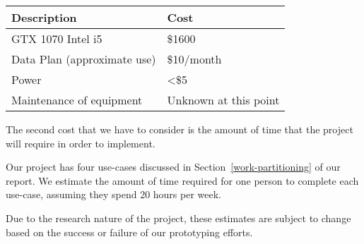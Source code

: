 \documentclass{scrreprt}
\begin{document}
\begin{longtable}[c]{@{}ll@{}}
\toprule
\begin{minipage}[t]{0.47\columnwidth}\raggedright\strut
{Description}
\strut\end{minipage} &
\begin{minipage}[t]{0.47\columnwidth}\raggedright\strut
{Cost}
\strut\end{minipage}\tabularnewline\midrule
\begin{minipage}[t]{0.47\columnwidth}\raggedright\strut
{GTX 1070 Intel i5}
\strut\end{minipage} &
\begin{minipage}[t]{0.47\columnwidth}\raggedright\strut
{\$1600}
\strut\end{minipage}\tabularnewline
\begin{minipage}[t]{0.47\columnwidth}\raggedright\strut
{Data Plan (approximate use)}
\strut\end{minipage} &
\begin{minipage}[t]{0.47\columnwidth}\raggedright\strut
{\$10/month}
\strut\end{minipage}\tabularnewline
\begin{minipage}[t]{0.47\columnwidth}\raggedright\strut
{Power}
\strut\end{minipage} &
\begin{minipage}[t]{0.47\columnwidth}\raggedright\strut
{\textless{}\$5}
\strut\end{minipage}\tabularnewline
\begin{minipage}[t]{0.47\columnwidth}\raggedright\strut
{Maintenance of equipment}
\strut\end{minipage} &
\begin{minipage}[t]{0.47\columnwidth}\raggedright\strut
{Unknown at this point}
\strut\end{minipage}\tabularnewline
\bottomrule
\end{longtable}

{The second cost that we have to consider is the amount of time that the
project will require in order to implement. }

{Our project has four use-cases discussed in Section~\ref{work-partitioning} of
our report. We estimate the amount of time required for one person to complete
each use-case, assuming they spend 20 hours per week.}

Due to the research nature of the project, these estimates are subject to
change based on the success or failure of our prototyping efforts.
\end{document}
